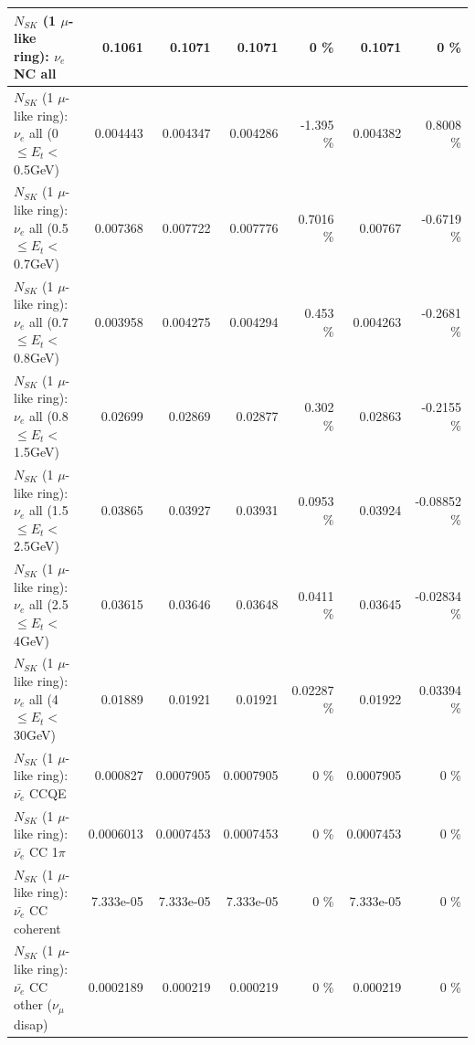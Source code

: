 \begin{table}
\begin{tabular}{| l | r | r | r  r | r  r |}
                                  $N_{SK}$ (1 $\mu$-like ring): $\nu_{e}$ NC all &          0.1061 &          0.1071 &          0.1071 &        0 \%  &          0.1071 &        0 \%  \\ 
\hline
           $N_{SK}$ (1 $\mu$-like ring): $\nu_{e}$ all (0 $\leq E_{t} <$ 0.5GeV) &        0.004443 &        0.004347 &        0.004286 &   -1.395 \%  &        0.004382 &   0.8008 \%  \\ 
         $N_{SK}$ (1 $\mu$-like ring): $\nu_{e}$ all (0.5 $\leq E_{t} <$ 0.7GeV) &        0.007368 &        0.007722 &        0.007776 &   0.7016 \%  &         0.00767 &  -0.6719 \%  \\ 
         $N_{SK}$ (1 $\mu$-like ring): $\nu_{e}$ all (0.7 $\leq E_{t} <$ 0.8GeV) &        0.003958 &        0.004275 &        0.004294 &    0.453 \%  &        0.004263 &  -0.2681 \%  \\ 
         $N_{SK}$ (1 $\mu$-like ring): $\nu_{e}$ all (0.8 $\leq E_{t} <$ 1.5GeV) &         0.02699 &         0.02869 &         0.02877 &    0.302 \%  &         0.02863 &  -0.2155 \%  \\ 
         $N_{SK}$ (1 $\mu$-like ring): $\nu_{e}$ all (1.5 $\leq E_{t} <$ 2.5GeV) &         0.03865 &         0.03927 &         0.03931 &   0.0953 \%  &         0.03924 & -0.08852 \%  \\ 
           $N_{SK}$ (1 $\mu$-like ring): $\nu_{e}$ all (2.5 $\leq E_{t} <$ 4GeV) &         0.03615 &         0.03646 &         0.03648 &   0.0411 \%  &         0.03645 & -0.02834 \%  \\ 
            $N_{SK}$ (1 $\mu$-like ring): $\nu_{e}$ all (4 $\leq E_{t} <$ 30GeV) &         0.01889 &         0.01921 &         0.01921 &  0.02287 \%  &         0.01922 &  0.03394 \%  \\ 
\hline
\hline
\hline
                                $N_{SK}$ (1 $\mu$-like ring): $\bar{\nu_e}$ CCQE &        0.000827 &       0.0007905 &       0.0007905 &        0 \%  &       0.0007905 &        0 \%  \\ 
                           $N_{SK}$ (1 $\mu$-like ring): $\bar{\nu_e}$ CC 1$\pi$ &       0.0006013 &       0.0007453 &       0.0007453 &        0 \%  &       0.0007453 &        0 \%  \\ 
                         $N_{SK}$ (1 $\mu$-like ring): $\bar{\nu_e}$ CC coherent &       7.333e-05 &       7.333e-05 &       7.333e-05 &        0 \%  &       7.333e-05 &        0 \%  \\ 
          $N_{SK}$ (1 $\mu$-like ring): $\bar{\nu_e}$ CC other ($\nu_\mu$ disap) &       0.0002189 &        0.000219 &        0.000219 &        0 \%  &        0.000219 &        0 \%  \\ 

\end{tabular}
\end{table}

